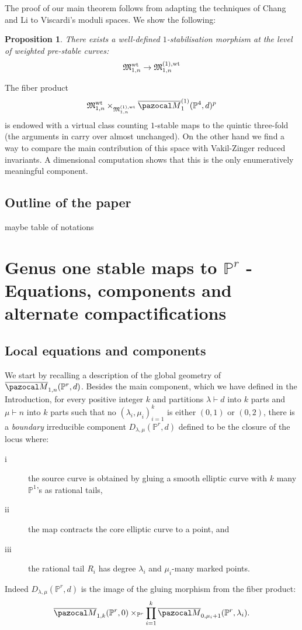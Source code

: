 \documentclass[11pt]{amsart}
\newcommand{\M}[4]{\overline{\pazocal M}_{#1,#2}(#3,#4)}
\newcommand{\Mone}[3]{\overline{\pazocal M}^{(1)}_{#1}(#2,#3)}
\newcommand{\PP}{\mathbb P}
\renewcommand{\to}{\rightarrow}
\newcommand{\MM}{\mathfrak M}
\theoremstyle{plain}
\newtheorem{prop}[thm]{Proposition}
\theoremstyle{definition}
\begin{document}
The proof of our main theorem follows from adapting the techniques of Chang and Li to Viscardi's moduli spaces. We show the following:
\begin{prop}
There exists a well-defined $1$-stabilisation morphism at the level of weighted pre-stable curves:
\[
\MM_{1,n}^{\rm{wt}}\to \MM_{1,n}^{(1),\rm{wt}}
\]
\end{prop}
The fiber product
\[
\MM_{1,n}^{\rm{wt}}\times_{\MM_{1,n}^{(1),\rm{wt}}}\Mone{1}{\PP^4}{d}^p
\]
is endowed with a virtual class counting $1$-stable maps to the quintic three-fold (the arguments in \cite{CLpfields} carry over almost unchanged). On the other hand we find a way to compare the main contribution of this space with Vakil-Zinger reduced invariants. A dimensional computation shows that this is the only enumeratively meaningful component.

\subsection*{Outline of the paper}
maybe table of notations
\section{Genus one stable maps to $\PP^r$ - Equations, components and alternate compactifications}

\subsection{Local equations and components}
We start by recalling a description of the global geometry of $\M{1}{n}{\PP^r}{d}$. Besides the main component, which we have defined in the Introduction, for every positive integer $k$ and partitions $\lambda\vdash d$ into $k$ parts and $\mu\vdash n$ into $k$ parts such that no $(\lambda_i,\mu_i)_{i=1}^k$ is either $(0,1)$ or $(0,2)$, there is a \emph{boundary} irreducible component $D_{\lambda,\mu}(\PP^r,d)$ defined to be the closure of the locus where:
\begin{description}
\item[i] the source curve is obtained by gluing a smooth elliptic curve with $k$ many $\PP^1$'s as rational tails,
\item[ii] the map contracts the core elliptic curve to a point, and
\item[iii] the rational tail $R_i$ has degree $\lambda_i$ and $\mu_i$-many marked points.
\end{description}
Indeed $D_{\lambda,\mu}(\PP^r,d)$ is the image of the gluing morphism from the fiber product:
$$\M{1}{k}{\PP^r}{0}\times_{\PP^r}\prod_{i=1}^k\M{0}{\mu_i+1}{\PP^r}{\lambda_i}.$$
\end{document}
